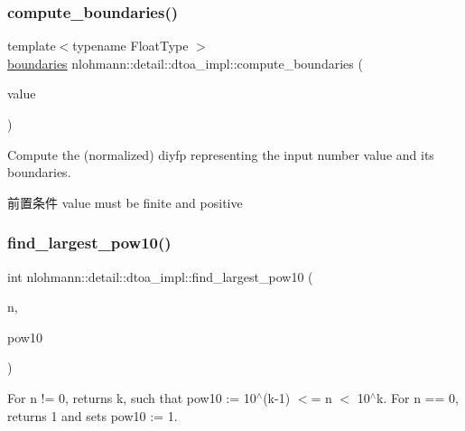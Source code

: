 \subsubsection{\texorpdfstring{compute\_boundaries()}{compute\_boundaries()}}
{\footnotesize\ttfamily template$<$typename Float\+Type $>$ \\
\mbox{\hyperlink{structnlohmann_1_1detail_1_1dtoa__impl_1_1boundaries}{boundaries}} nlohmann\+::detail\+::dtoa\+\_\+impl\+::compute\+\_\+boundaries (\begin{DoxyParamCaption}\item[{Float\+Type}]{value }\end{DoxyParamCaption})}

Compute the (normalized) diyfp representing the input number \textquotesingle{}value\textquotesingle{} and its boundaries.

\begin{DoxyPrecond}{前置条件}
value must be finite and positive 
\end{DoxyPrecond}
\mbox{\label{namespacenlohmann_1_1detail_1_1dtoa__impl_a36ded358763b5dbcea9867660fbe4e28}} 
\subsubsection{\texorpdfstring{find\_largest\_pow10()}{find\_largest\_pow10()}}
{\footnotesize\ttfamily int nlohmann\+::detail\+::dtoa\+\_\+impl\+::find\+\_\+largest\+\_\+pow10 (\begin{DoxyParamCaption}\item[{const std\+::uint32\+\_\+t}]{n,  }\item[{std\+::uint32\+\_\+t \&}]{pow10 }\end{DoxyParamCaption})\hspace{0.3cm}{\ttfamily [inline]}}

For n != 0, returns k, such that pow10 \+:= 10$^\wedge$(k-\/1) $<$= n $<$ 10$^\wedge$k. For n == 0, returns 1 and sets pow10 \+:= 1. \mbox{\label{namespacenlohmann_1_1detail_1_1dtoa__impl_ab441f2761e33839ca48bc2225e14a2a9}} 

